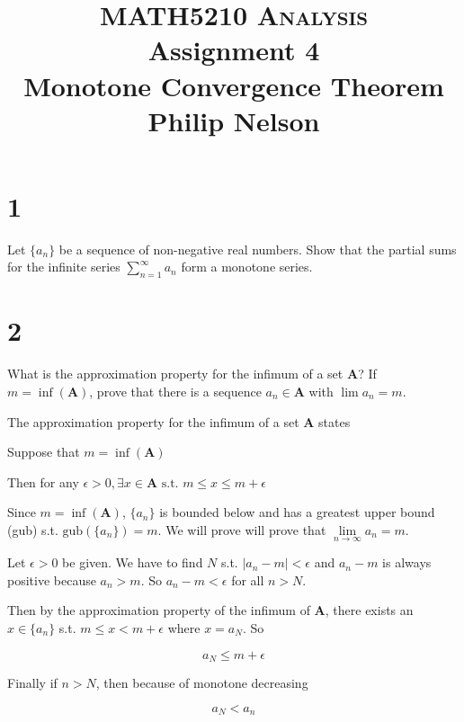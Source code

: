 \documentclass[10pt,letterpaper]{article}
\newcommand\A{\mathbf{A}}
\newcommand\ds{\displaystyle}
\begin{document}
\title{MATH5210 \textsc{Analysis}
  \\ Assignment 4
  \\ Monotone Convergence Theorem
  \\ Philip Nelson
}

\date{}

\maketitle

\section*{1} Let $\{a_n\}$ be a sequence of non-negative real numbers. Show that the partial sums for the infinite series $\ds \sum_{n=1}^{\infty } a_n$ form a monotone series.

\section*{2} What is the approximation property for the infimum of a set $\A$? If $m = \inf(\A)$, prove that there is a sequence $a_n \in \A$ with $\lim a_n = m$.

\bigskip

The approximation property for the infimum of a set $\A$ states

Suppose that $m = \inf(\A)$

Then for any $\epsilon > 0, \exists x \in \A \text{ s.t. }  m \leq x \leq m + \epsilon$

\bigskip

Since $m = \inf(\A)$, $\{a_n\}$ is bounded below and has a greatest upper bound (gub) s.t. $\text{gub}(\{a_n\}) = m$.
We will prove will prove that $\lim\limits_{n \to \infty} a_n = m$.

Let $\epsilon > 0$ be given. We have to find $N$ s.t. $| a_n - m | < \epsilon$ and $a_n - m$ is always positive because $a_n > m$. So $a_n - m < \epsilon$ for all $n > N$.

Then by the approximation property of the infimum of $\A$, there exists an $x \in \{a_n\}$ s.t. $m \leq x < m + \epsilon$ where $x = a_N$. So

\begin{equation}
a_N \leq m + \epsilon
\end{equation}

Finally if $n>N$, then because of monotone decreasing

\begin{equation}
a_N < a_n
\end{equation}
\end{document}
